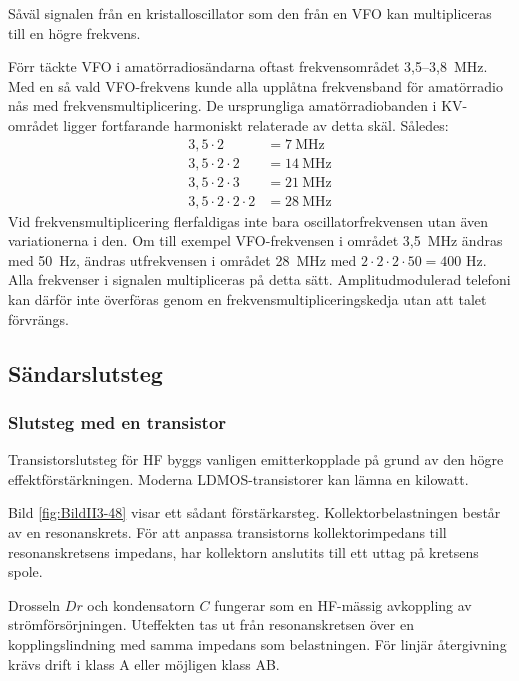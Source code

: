 Såväl signalen från en kristalloscillator som den från en VFO kan
multipliceras till en högre frekvens.

Förr täckte VFO i amatörradiosändarna oftast frekvensområdet 3,5--3,8~MHz.
Med en så vald VFO-frekvens kunde alla upplåtna frekvensband för
amatörradio nås med frekvensmultiplicering.
De ursprungliga amatörradiobanden i KV-området ligger fortfarande harmoniskt
relaterade av detta skäl. Således:
\begin{align*}
  3,5 \cdot 2 & = 7\ \text{MHz} \\
  3,5 \cdot 2 \cdot 2 & = 14\ \text{MHz} \\
  3,5 \cdot 2 \cdot 3 & = 21\ \text{MHz} \\
  3,5 \cdot 2 \cdot 2 \cdot 2 & = 28\ \text{MHz}
\end{align*}
Vid frekvensmultiplicering flerfaldigas inte bara oscillatorfrekvensen utan
även variationerna i den.
Om till exempel VFO-frekvensen i området 3,5~MHz ändras med 50~Hz, ändras
utfrekvensen i området 28~MHz med \(2 \cdot 2 \cdot 2 \cdot 50 = 400\) Hz.
Alla frekvenser i signalen multipliceras på detta sätt.
Amplitudmodulerad telefoni kan därför inte överföras genom en
frekvensmultipliceringskedja utan att talet förvrängs.

\subsection{Sändarslutsteg}

\subsubsection{Slutsteg med en transistor}


Transistorslutsteg för HF byggs vanligen emitterkopplade på grund av den
högre effektförstärkningen.
Moderna LDMOS-transistorer kan lämna en kilowatt.

Bild \ref{fig:BildII3-48} visar ett sådant förstärkarsteg.
Kollektorbelastningen består av en resonanskrets.
För att anpassa transistorns kollektorimpedans till resonanskretsens
impedans, har kollektorn anslutits till ett uttag på kretsens spole.

Drosseln \(Dr\) och kondensatorn \(C\) fungerar som en HF-mässig avkoppling av
strömförsörjningen.
Uteffekten tas ut från resonanskretsen över en kopplingslindning med samma
impedans som belastningen.
För linjär återgivning krävs drift i klass A eller möjligen klass AB.

